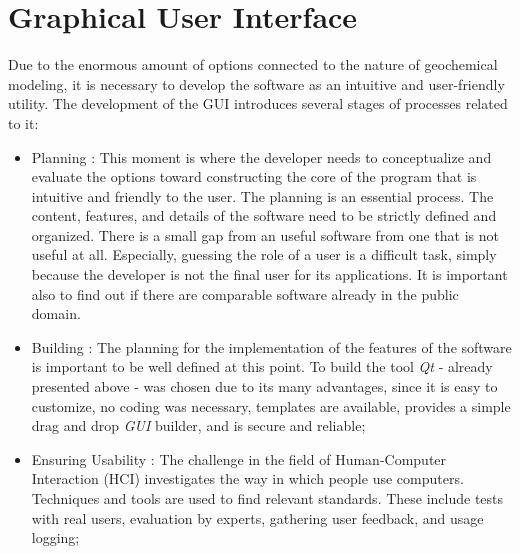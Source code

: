 \section{Graphical User Interface}
Due to the enormous amount of options connected to the nature of geochemical modeling, it is necessary to develop the software as an intuitive and user-friendly utility. The development of the GUI introduces several stages of processes related to it:
\begin{itemize}
\item Planning : This moment is where the developer needs to conceptualize and evaluate the options toward constructing the core of the program that is intuitive and friendly to the user. The planning is an essential process. The content, features, and details of the software need to be strictly defined and organized. There is a small gap from an useful software from one that is not useful at all. Especially, guessing the role of a user is a difficult task, simply because the developer is not the final user for its applications. It is important also to find out if there are comparable software already in the public domain.
\item Building : The planning for the implementation of the features of the software is important to be well defined at this point. To build the tool \emph{Qt} - already presented above - was chosen due to its many advantages, since it is easy to customize, no coding was necessary, templates are available, provides a simple drag and drop \emph{GUI}  builder, and is secure and reliable;
\item Ensuring Usability : The challenge in the field of Human-Computer Interaction (HCI) investigates the way in which people use computers. Techniques and tools are used to find relevant standards. These include tests with real users, evaluation by experts, gathering user feedback, and usage logging;
\end{itemize}


